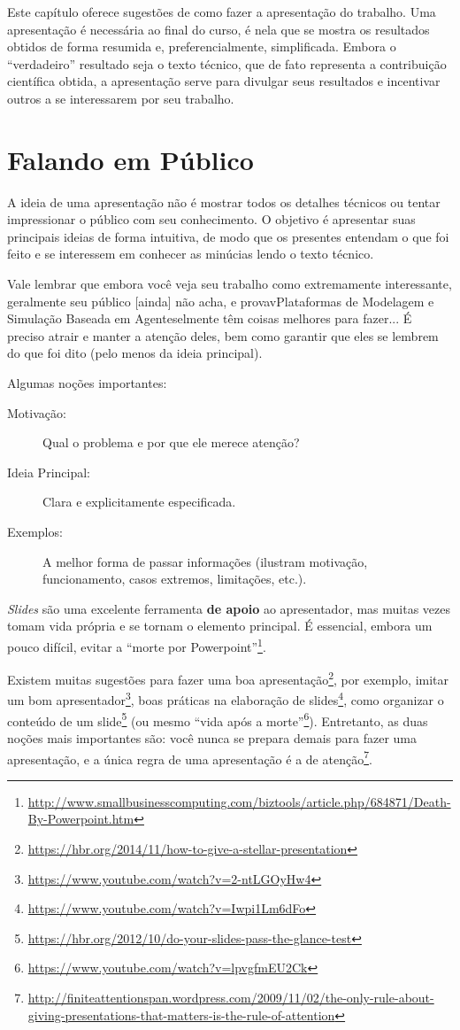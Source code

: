 Este capítulo oferece sugestões de como fazer a apresentação do trabalho. Uma
apresentação é necessária ao final do curso, é nela que se mostra os resultados
obtidos de forma resumida e, preferencialmente, simplificada. Embora o ``verdadeiro''
resultado seja o texto técnico, que de fato representa a contribuição científica
obtida, a apresentação serve para divulgar seus resultados e incentivar outros a
se interessarem por seu trabalho.

\section{Falando em Público}
A ideia de uma apresentação não é mostrar todos os detalhes técnicos ou tentar
impressionar o público com seu conhecimento. O objetivo é apresentar suas principais
ideias de forma intuitiva, de modo que os presentes entendam o que foi feito e
se interessem em conhecer as minúcias lendo o texto técnico.

Vale lembrar que embora você veja seu trabalho como extremamente interessante,
geralmente seu público [ainda] não acha, e provavPlataformas de Modelagem e Simulação Baseada em Agenteselmente têm coisas melhores para fazer...
É preciso atrair e manter a atenção deles, bem como garantir que eles se lembrem
do que foi dito (pelo menos da ideia principal).

Algumas noções importantes:
\begin{description}
\item[Motivação:] Qual o problema e por que ele merece atenção?
\item[Ideia Principal:] Clara e explicitamente especificada.
\item[Exemplos:] A melhor forma de passar informações (ilustram motivação,
funcionamento, casos extremos, limitações, etc.).
\end{description}

\emph{Slides} são uma excelente ferramenta \textbf{de apoio} ao apresentador, mas
muitas vezes tomam vida própria e se tornam o elemento principal. É essencial,
embora um pouco difícil,  evitar a ``morte por Powerpoint''\footnote{%
\url{http://www.smallbusinesscomputing.com/biztools/article.php/684871/Death-By-Powerpoint.htm}}.

Existem muitas sugestões para fazer uma boa apresentação\footnote{\url{https://hbr.org/2014/11/how-to-give-a-stellar-presentation}},
por exemplo, imitar um bom apresentador\footnote{\url{https://www.youtube.com/watch?v=2-ntLGOyHw4}}, boas práticas na elaboração de slides\footnote{\url{https://www.youtube.com/watch?v=Iwpi1Lm6dFo}}, como organizar o conteúdo de um slide\footnote{\url{https://hbr.org/2012/10/do-your-slides-pass-the-glance-test}} (ou mesmo ``vida após a morte''\footnote{\url{https://www.youtube.com/watch?v=lpvgfmEU2Ck}}). Entretanto, as duas noções mais importantes são: você nunca se prepara demais para fazer uma apresentação, e a única regra de uma apresentação é a
de atenção\footnote{\url{http://finiteattentionspan.wordpress.com/2009/11/02/the-only-rule-about-giving-presentations-that-matters-is-the-rule-of-attention}}.

